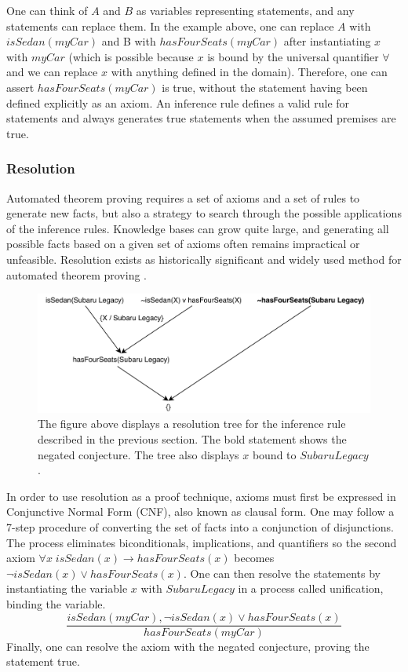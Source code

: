 \documentclass{article}
\begin{document}
One can think of $A$ and $B$ as variables representing statements, and any statements can replace them. In the example above, one can replace $A$ with $isSedan(myCar)$ and B with $hasFourSeats(myCar)$ after instantiating $x$ with $myCar$ (which is possible because $x$ is bound by the universal quantifier $\forall$ and we can replace $x$ with anything defined in the domain). Therefore, one can assert $hasFourSeats(myCar)$ is true, without the statement having been defined explicitly as an axiom. An inference rule defines a valid rule for statements and always generates true statements when the assumed premises are true. 
\subsubsection{Resolution}

Automated theorem proving requires a set of axioms and a set of rules to generate new facts, but also a strategy to search through the possible applications of the inference rules. Knowledge bases can grow quite large, and generating all possible facts based on a given set of axioms often remains impractical or unfeasible. Resolution exists as historically significant and widely used method for automated theorem proving \cite[51]{ertel2018introduction}. 

\begin{figure}[h]
\centering
\includegraphics[width=6in]{resolution_tree}
\caption{The figure above displays a resolution tree for the inference rule described in the previous section. The bold statement shows the negated conjecture. The tree also displays $x$ bound to $SubaruLegacy$.}
\label{fig:resolution_tree}
\end{figure}

In order to use resolution as a proof technique, axioms must first be expressed in Conjunctive Normal Form (CNF), also known as clausal form. One may follow a 7-step procedure of converting the set of facts into a conjunction of disjunctions. The process eliminates biconditionals, implications, and quantifiers so the second axiom $\forall x \; isSedan(x) \rightarrow hasFourSeats(x)$ becomes 
$\lnot isSedan(x) \lor hasFourSeats(x)$. One can then resolve the statements by instantiating the variable $x$ with $SubaruLegacy$ in a process called unification, binding the variable. 
\[\frac{isSedan(myCar), \lnot isSedan(x) \lor hasFourSeats(x)}{hasFourSeats(myCar)}\]
Finally, one can resolve the axiom with the negated conjecture, proving the statement true. 
\end{document}
